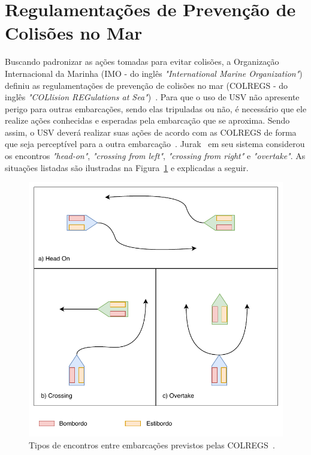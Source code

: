     \section{Regulamentações de Prevenção de Colisões no Mar}\label{subchap2:colregs}
        Buscando padronizar as ações tomadas para evitar colisões, a Organização Internacional da Marinha (IMO - do inglês \textit{"International Marine Organization"}) definiu as regulamentações de prevenção de colisões no mar (COLREGS - do inglês \textit{"COLlision REGulations at Sea"})~\cite{COLREGS}.
        Para que o uso de USV não apresente perigo para outras embarcações, sendo elas tripuladas ou não, é necessário que ele realize ações conhecidas e esperadas pela embarcação que se aproxima. Sendo assim, o USV deverá realizar suas ações de acordo com as COLREGS de forma que seja perceptível para a outra embarcação~\cite{Kuwata2014Safe}. Jurak~\cite{Jurak2020COLREGS} em seu sistema considerou os encontros \textit{"head-on"}, \textit{"crossing from left"}, \textit{"crossing from right"} e \textit{"overtake"}. As situações listadas são ilustradas na Figura~\ref{fig:Jurak2020COLREGS_colregsSituations} e explicadas a seguir. 
        
        \begin{figure}
            \centering
            \includegraphics[width=\textwidth]{fig/chap2/encontros_colregs.pdf}
            \caption{Tipos de encontros entre embarcações previstos pelas COLREGS~\cite{Jurak2020COLREGS}.}
            \label{fig:Jurak2020COLREGS_colregsSituations}
        \end{figure}
        
